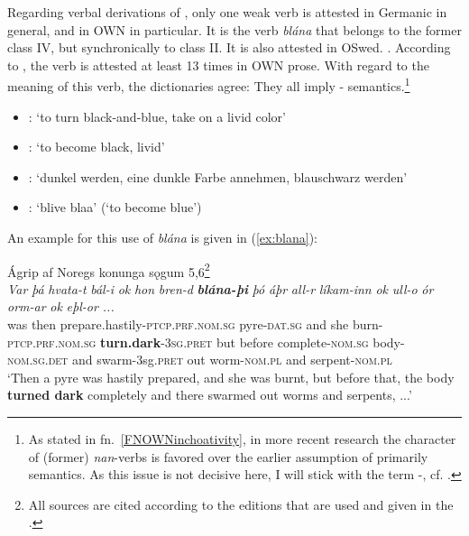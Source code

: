 \documentclass[output=paper,colorlinks,citecolor=brown]{langscibook}
\begin{document}
Regarding verbal derivations of , only one weak verb is attested in Germanic in general, and in OWN in particular. It is the verb \textit{blána} that belongs to the former class IV, but synchronically to class II. It is also attested in OSwed. . According to , the verb is attested at least 13 times in OWN prose. With regard to the meaning of this verb, the dictionaries agree: They all imply - semantics.\footnote{As stated in fn.\ \ref{FNOWNinchoativity}, in more recent research the  character of (former) \textit{nan}-verbs is favored over the earlier assumption of primarily  semantics. As this issue is not decisive here, I will stick with the term -, cf. \citet{VillanuevaSvensson2011}.} 

\begin{itemize}
\item {}: ‘to turn black-and-blue, take on a livid color’
\item {}: ‘to become black, livid’
\item {}: `dunkel werden, eine dunkle Farbe annehmen, blauschwarz werden'
\item {}: `blive blaa' (`to become blue')
\end{itemize}

An example for this use of \textit{blána} is given in (\ref{ex:blana}):

\begin{exe}
    \ex Ágrip af Noregs konunga sǫgum 5,6\footnote{All sources are cited according to the editions that are used and given in the .} \label{ex:blana}\\
    \gll \textit{Var} \textit{þá} \textit{hvata-t} \textit{bál-i} \textit{ok} \textit{hon} \textit{bren-d} {\textit{\textbf{blána-þi}} } \textit{þó} \textit{áþr} \textit{all-r} \textit{líkam-inn} \textit{ok} \textit{ull-o} \textit{ór} \textit{orm-ar} \textit{ok} \textit{eþl-or ...}\\
    was then {prepare.hastily-\textsc{ptcp.prf.nom.sg}} pyre-\textsc{dat.sg} and she burn-\textsc{ptcp.prf.nom.sg} \textbf{turn.dark}-\textsc{3sg.pret} but before complete-\textsc{nom.sg} body-\textsc{nom.sg.det} and swarm-3sg.\textsc{pret} out worm-\textsc{nom.pl} and serpent-\textsc{nom.pl} \\
    \glt ‘Then a pyre was hastily prepared, and she was burnt, but before that, the body \textbf{turned dark} completely and there swarmed out worms and serpents, ...’\\
\end{exe} 
\end{document}
